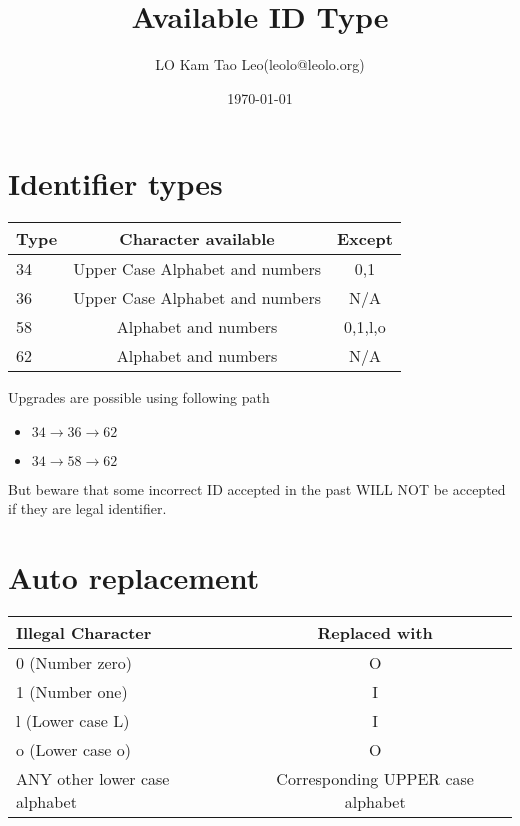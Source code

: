 \documentclass[a4paper,12pt,hidelinks]{article}
\title{Available ID Type}
\author{LO Kam Tao Leo(leolo@leolo.org)}
\date{\today}
\begin{document}
\maketitle
\section{Identifier types}
\begin{tabular}{|l|c|c|}
\hline
Type  & Character available & Except \\
\hline
34    & Upper Case Alphabet and numbers & 0,1 \\
\hline
36    & Upper Case Alphabet and numbers & N/A \\
\hline
58    & Alphabet and numbers & 0,1,l,o \\
\hline
62    & Alphabet and numbers & N/A \\
\hline
\end{tabular}

\vspace{0.25in}
Upgrades are possible using following path
\begin{itemize}
\item $34\rightarrow36\rightarrow62$
\item $34\rightarrow58\rightarrow62$
\end{itemize}

But beware that some incorrect ID accepted in the past WILL NOT be accepted if they are legal identifier.

\section{Auto replacement}
\begin{tabular}{|l|c|}
\hline
Illegal Character  & Replaced with \\
\hline
0 (Number zero)   & O \\
\hline
1 (Number one)  & I  \\
\hline
l (Lower case L)    & I  \\
\hline
o (Lower case o)   & O  \\\hline
ANY other lower case alphabet & Corresponding UPPER case alphabet\\
\hline
\end{tabular}
\end{document}
